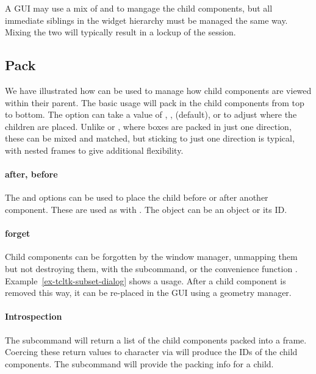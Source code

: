 A GUI may use a mix of  and  to mangage the child components,
but all immediate siblings in the widget hierarchy must be managed the same
way. Mixing the two will typically result in a lockup of the \R\/
session.


\subsection{Pack}
\label{sec:tcltk:pack}


We have illustrated how  can be used to manage how
child components are viewed within their parent. The basic usage
 will pack in the child components from top to
bottom. The  option can take a value of
, ,  (default), or 
to adjust where the children are placed.  Unlike \GTK{} or \Qt,
where boxes are packed in just one direction, these can be mixed and
matched, but sticking to just one direction is typical, with nested
frames to give additional flexibility.

\paragraph{after, before}
The  and  options can be
used to place the child before or after another component. These are
used as with . The object
 can be an \R\/ object or its ID. 


\paragraph{forget}
Child components can be forgotten by the window manager, unmapping
them but not destroying them, with the 
subcommand, or the convenience function .
Example~\ref{ex-tcltk-subset-dialog} shows a usage.  After a child
component is removed this way, it can be re-placed in the GUI using a
geometry manager.

\paragraph{Introspection}
The subcommand  will return a list of the
child components packed into a frame. Coercing these return values to
character via  will produce the IDs of the child
components. The subcommand  will provide the
packing info for a child.
\\


